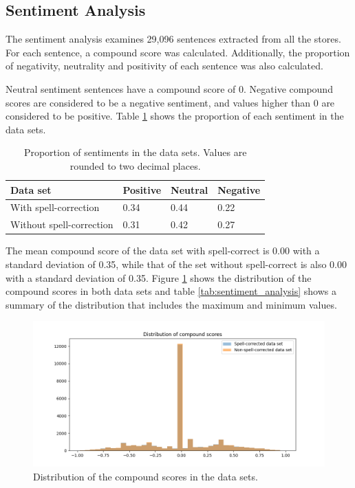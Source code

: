 \subsection{Sentiment Analysis}
\label{sec:sentiment_analysis}

The sentiment analysis examines 29,096 sentences extracted from all the stores. For each sentence, a compound score was calculated. Additionally, the proportion of negativity, neutrality and positivity of each sentence was also calculated.

Neutral sentiment sentences have a compound score of 0. Negative compound scores are considered to be a negative sentiment, and values higher than 0 are considered to be positive. Table \ref{tab:sentiment_proportion} shows the proportion of each sentiment in the data sets.

\begin{table}
    \centering
    \begin{tabular}{llll}
        \hline
        Data set & Positive & Neutral & Negative \\ \hline
        With spell-correction & 0.34 & 0.44 & 0.22 \\
        Without spell-correction & 0.31 & 0.42 & 0.27 \\
        \hline
    \end{tabular}
    \caption{Proportion of sentiments in the data sets. Values are rounded to two decimal places.}
    \label{tab:sentiment_proportion}
\end{table}

The mean compound score of the data set with spell-correct is 0.00 with a standard deviation of 0.35, while that of the set without spell-correct is also 0.00 with a standard deviation of 0.35. Figure \ref{fig:sentiment_distribution} shows the distribution of the compound scores in both data sets and table \ref{tab:sentiment_analysis} shows a summary of the distribution that includes the maximum and minimum values.

\begin{figure}[H]
    \centering
    \includegraphics[width=\textwidth]{resources/compound_scores.png}
    \caption{Distribution of the compound scores in the data sets.}
    \label{fig:sentiment_distribution}
\end{figure}

